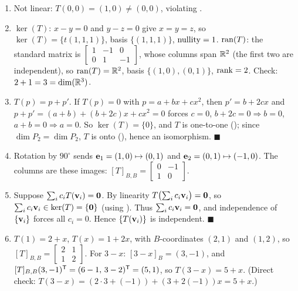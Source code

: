 \begin{enumerate}[label=\textbf{4.\arabic*},leftmargin=2.6em,itemsep=8pt]

\item Not linear: $T(0,0)=(1,0)\neq(0,0)$, violating .

\item $\ker(T)$: $x-y=0$ and $y-z=0$ give $x=y=z$, so $\ker(T)=\{t(1,1,1)\}$, basis $\{(1,1,1)\}$, $\operatorname{nullity}=1$. $\operatorname{ran}(T)$: the standard matrix is $\left[\begin{smallmatrix}1&-1&0\\0&1&-1\end{smallmatrix}\right]$, whose columns span $\mathbb{R}^2$ (the first two are independent), so $\operatorname{ran}(T)=\mathbb{R}^2$, basis $\{(1,0),(0,1)\}$, $\operatorname{rank}=2$. Check: $2+1=3=\operatorname{dim}(\mathbb{R}^3)$. \checkmark

\item $T(p)=p+p'$. If $T(p)=0$ with $p=a+bx+cx^2$, then $p'=b+2cx$ and $p+p'=(a+b)+(b+2c)x+cx^2=0$ forces $c=0$, $b+2c=0\Rightarrow b=0$, $a+b=0\Rightarrow a=0$. So $\ker(T)=\{0\}$, and $T$ is one-to-one (); since $\dim P_2=\dim P_2$, $T$ is onto (), hence an isomorphism. $\blacksquare$

\item Rotation by $90^\circ$ sends $\mathbf{e}_1=(1,0)\mapsto(0,1)$ and $\mathbf{e}_2=(0,1)\mapsto(-1,0)$. The columns are these images: $[T]_{B,B}=\left[\begin{smallmatrix}0&-1\\1&0\end{smallmatrix}\right]$.

\item Suppose $\sum_{i}c_iT(\mathbf{v}_i)=\mathbf{0}$. By linearity $T\bigl(\sum_i c_i\mathbf{v}_i\bigr)=\mathbf{0}$, so $\sum_i c_i\mathbf{v}_i\in\ker(T)=\{\mathbf{0}\}$ (using ). Thus $\sum_i c_i\mathbf{v}_i=\mathbf{0}$, and independence of $\{\mathbf{v}_i\}$ forces all $c_i=0$. Hence $\{T(\mathbf{v}_i)\}$ is independent. $\blacksquare$

\item $T(1)=2+x$, $T(x)=1+2x$, with $B$-coordinates $(2,1)$ and $(1,2)$, so $[T]_{B,B}=\left[\begin{smallmatrix}2&1\\1&2\end{smallmatrix}\right]$. For $3-x$: $[3-x]_B=(3,-1)$, and $[T]_{B,B}(3,-1)^{\mathsf{T}}=(6-1,\,3-2)^{\mathsf{T}}=(5,1)$, so $T(3-x)=5+x$. (Direct check: $T(3-x)=(2\cdot3+(-1))+(3+2(-1))x=5+x$.) \checkmark

\end{enumerate}
